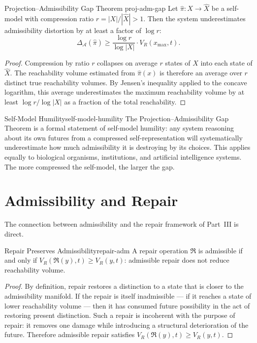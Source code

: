 \documentclass[12pt,twoside,openright]{book}
\newcommand{\adm}{\mathcal{A}}
\newcommand{\repair}{\mathfrak{R}}
\begin{document}
\begin{theorem}{Projection--Admissibility Gap Theorem}%
  {proj-adm-gap}
  Let $\hat\pi:X\to\hat{X}$ be a self-model with compression
  ratio $r = |X|/|\hat{X}| > 1$. Then the system
  underestimates admissibility distortion by at least a
  factor of $\log r$:
  \[
    \Delta_\adm(\hat\pi)
    \ge \frac{\log r}{\log|X|}\cdot V_R(x_\mathrm{max},t).
  \]
\end{theorem}

\begin{proof}
  Compression by ratio $r$ collapses on average $r$ states
  of $X$ into each state of $\hat{X}$. The reachability
  volume estimated from $\hat\pi(x)$ is therefore an
  average over $r$ distinct true reachability volumes. By
  Jensen's inequality applied to the concave logarithm,
  this average underestimates the maximum reachability
  volume by at least $\log r/\log|X|$ as a fraction of the
  total reachability.
\end{proof}

\begin{remark}{Self-Model Humility}{self-model-humility}
  The Projection--Admissibility Gap Theorem is a formal
  statement of self-model humility: any system reasoning
  about its own futures from a compressed self-representation
  will systematically underestimate how much admissibility
  it is destroying by its choices. This applies equally to
  biological organisms, institutions, and artificial
  intelligence systems. The more compressed the self-model,
  the larger the gap.
\end{remark}

\section{Admissibility and Repair}
\label{sec:ch14-repair}

The connection between admissibility and the repair
framework of Part~III is direct.

\begin{proposition}{Repair Preserves Admissibility}{repair-adm}
  A repair operation $\repair$ is admissible if and only if
  $V_R(\repair(y),t) \ge V_R(y,t)$: admissible repair does
  not reduce reachability volume.
\end{proposition}

\begin{proof}
  By definition, repair restores a distinction to a state
  that is closer to the admissibility manifold. If the
  repair is itself inadmissible --- if it reaches a state
  of lower reachability volume --- then it has consumed
  future possibility in the act of restoring present
  distinction. Such a repair is incoherent with the purpose
  of repair: it removes one damage while introducing a
  structural deterioration of the future. Therefore
  admissible repair satisfies
  $V_R(\repair(y),t)\ge V_R(y,t)$.
\end{proof}
\end{document}

